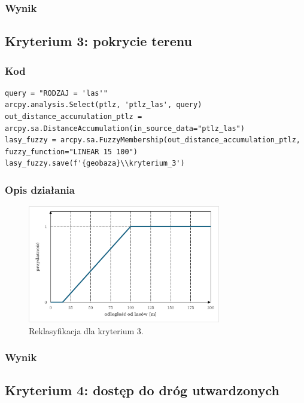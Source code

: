 \documentclass{article}
\begin{document}
\subsubsection{Wynik}
\newpage
\subsection{Kryterium 3: pokrycie terenu}
\subsubsection{Kod}
\begin{lstlisting}
query = "RODZAJ = 'las'"
arcpy.analysis.Select(ptlz, 'ptlz_las', query)
out_distance_accumulation_ptlz = arcpy.sa.DistanceAccumulation(in_source_data="ptlz_las")
lasy_fuzzy = arcpy.sa.FuzzyMembership(out_distance_accumulation_ptlz, fuzzy_function="LINEAR 15 100")
lasy_fuzzy.save(f'{geobaza}\\kryterium_3')
\end{lstlisting}

\subsubsection{Opis działania}
\begin{figure}[H]
    \centering
    \includegraphics[width=0.75\textwidth]{img/kryterium3-wykres-glowny.png}
    \caption*{Reklasyfikacja dla kryterium 3.}
\end{figure}
\subsubsection{Wynik}
\newpage
\subsection{Kryterium 4: dostęp do dróg utwardzonych}
\end{document}

